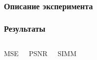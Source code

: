 \begin{frame}[t]
\frametitle{Описание эксперимента}

\end{frame}

\begin{frame}[t]
\frametitle{Результаты}
\begin{columns}
\begin{block}{MSE}
    \vspace{3mm}
\end{block}
 
\begin{block}{PSNR}
    \vspace{3mm}
\end{block}

\begin{block}{SIMM}
    \vspace{3mm}
\end{block}

\end{columns}
\end{frame}

